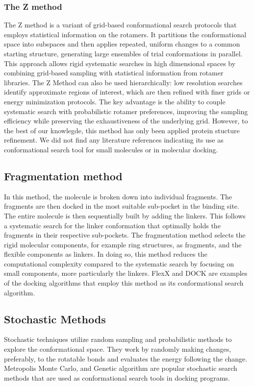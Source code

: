 \documentclass[12pt]{article}
\begin{document}
\subsubsection{The Z method}
    The Z method\cite{CH2_Petrella2011} is a variant of grid-based conformational search protocols that employs statistical information on the rotamers. It partitions the conformational space into subspaces and then applies repeated, uniform changes to a common starting structure, generating large ensembles of trial conformations in parallel. This approach allows rigid systematic searches in high dimensional spaces by combining grid‑based sampling with statistical information from rotamer libraries. The Z Method can also be used hierarchically: low resolution searches identify approximate regions of interest, which are then refined with finer grids or energy minimization protocols. The key advantage is the ability to couple systematic search with probabilistic rotamer preferences, improving the sampling efficiency while preserving the exhaustiveness of the underlying grid. However, to the best of our knowlegde, this method has only been applied protein stucture refinement. We did not find any literature references indicating its use as conformational search tool for small molecules or in molecular docking. 

\subsection{Fragmentation method}

In this method, the molecule is broken down into individual fragments. The fragments are then docked in the most suitable sub-pocket in the binding site. The entire molecule is then sequentially built by adding the linkers. This follows a systematic search for the linker conformation that optimally holds the fragments in their respective sub-pockets. The fragmentation method selects the rigid molecular components, for example ring structures, as fragments, and the flexible components as linkers. In doing so, this method reduces the computational complexity compared to the systematic search by focusing on small components, more particularly the linkers. FlexX and DOCK are examples of the docking algorithms that employ this method as its conformational search algorithm.


\subsection{Stochastic Methods}
Stochastic techniques utilize random sampling and probabilistic methods to explore the conformational space. They work by randomly making changes, preferably, to the rotatable bonds and evaluates the energy following the change. Metropolis Monte Carlo, and Genetic algorithm are popular stochastic search methods that are used as conformational search tools in docking programs. 
\end{document}
